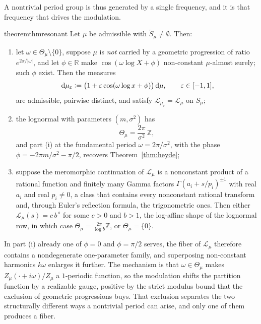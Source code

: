 \documentclass[sn-mathphys-num]{sn-jnl}
\theoremstyle{thmstyleone}%
\theoremstyle{thmstyletwo}%
\theoremstyle{thmstylethree}%
\theoremstyle{thmstyleone}%
\providecommand{\R}{\mathbb{R}}
\providecommand{\Z}{\mathbb{Z}}
\providecommand{\Leh}{\mathscr{L}}
\providecommand{\dd}{\,\mathrm{d}}
\providecommand{\eqdef}{\mathrel{\vcentcolon=}}
\begin{document}
	A nontrivial period group is thus generated by a single frequency,
	and it is that frequency that drives the modulation.
	
	\begin{restatable}{theorem}{thmresonant}\label{thm:resonant}
		Let $\mu$ be admissible with $\mathring S_\mu\neq\emptyset$. Then:
		\begin{enumerate}[label=\textup{(\roman*)},leftmargin=2.2em]
			\item let $\omega\in\Theta_\mu\setminus\{0\}$, suppose
			$\mu$ is \emph{not} carried by a geometric progression of
			ratio $e^{2\pi/|\omega|}$, and let $\phi\in\R$ make
			$\cos(\omega\log X+\phi)$ non-constant $\mu$-almost
			surely; such $\phi$ exist. Then the measures
			\begin{equation}\label{eq:modulation}
				\dd\mu_\varepsilon\eqdef
				\bigl(1+\varepsilon\cos(\omega\log x+\phi)\bigr)\dd\mu,
				\qquad\varepsilon\in[-1,1],
			\end{equation}
			are admissible, pairwise distinct, and satisfy
			$\Leh_{\mu_\varepsilon}=\Leh_\mu$ on $S_\mu$;
			\item the lognormal with parameters $(m,\sigma^2)$ has
			\begin{equation}\label{eq:Pilognormal}
				\Theta_\mu=\frac{2\pi}{\sigma^2}\,\Z,
			\end{equation}
			and part (i) at the fundamental period
			$\omega=2\pi/\sigma^2$, with the phase
			$\phi=-2\pi m/\sigma^2-\pi/2$, recovers
			Theorem~\ref{thm:heyde};
			\item suppose the meromorphic continuation of $\Leh_\mu$
			is a nonconstant product of a rational function and finitely
			many Gamma factors $\Gamma(a_i+s/p_i)^{\pm1}$ with real
			$a_i$ and real $p_i\neq0$, a class that contains every
			nonconstant rational transform and, through Euler's
			reflection formula, the trigonometric ones. Then either
			$\Leh_\mu(s)=c\,b^{\,s}$ for some $c>0$ and $b>1$, the
			log-affine shape of the lognormal row, in which case
			$\Theta_\mu=\tfrac{2\pi}{\log b}\Z$, or
			$\Theta_\mu=\{0\}$.
		\end{enumerate}
	\end{restatable}
	
	In part (i) already one of $\phi=0$ and $\phi=\pi/2$ serves, the
	fiber of $\Leh_\mu$ therefore contains a nondegenerate
	one-parameter family, and superposing non-constant harmonics
	$k\omega$ enlarges it further. The mechanism is that
	$\omega\in\Theta_\mu$ makes $Z_\mu(\cdot+i\omega)/Z_\mu$ a
	$1$-periodic function, so the modulation shifts the partition
	function by a realizable gauge, positive by the strict modulus
	bound that the exclusion of geometric progressions buys. That
	exclusion separates the two structurally different ways a
	nontrivial period can arise, and only one of them produces a
	fiber.
	
\end{document}
